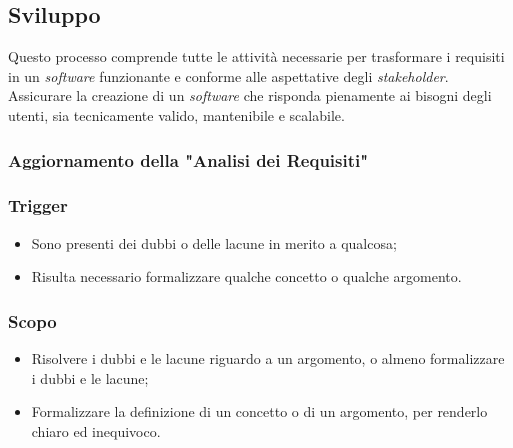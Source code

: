 \subsection{Sviluppo}
Questo processo comprende tutte le attività necessarie per trasformare i requisiti in un \textit{software} funzionante e conforme alle aspettative degli \textit{stakeholder}. \\
Assicurare la creazione di un \textit{software} che risponda pienamente ai bisogni degli utenti, sia tecnicamente valido, mantenibile e scalabile.


\subsubsection{Aggiornamento della "Analisi dei Requisiti"}
\label{aggiornare-adr}
\subsubsection*{Trigger}
\begin{itemize}
	\item Sono presenti dei dubbi o delle lacune in merito a qualcosa;
	\item Risulta necessario formalizzare qualche concetto o qualche argomento.
\end{itemize}

\subsubsection*{Scopo}
\begin{itemize}
	\item Risolvere i dubbi e le lacune riguardo a un argomento, o almeno formalizzare i dubbi e le lacune;
	\item Formalizzare la definizione di un concetto o di un argomento, per renderlo chiaro ed inequivoco.
\end{itemize}

